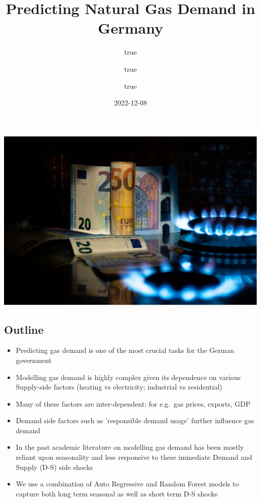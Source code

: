 \documentclass[
]{article}
\title{Predicting Natural Gas Demand in Germany}
\author{true \and true \and true}
\date{2022-12-08}
\providecommand{\tightlist}{%
  \setlength{\itemsep}{0pt}\setlength{\parskip}{0pt}}
\begin{document}
\maketitle

{
\setcounter{tocdepth}{2}
\tableofcontents
}
\includegraphics[width=1\linewidth]{figures/Gas1}

\hypertarget{outline}{%
\subsection{Outline}\label{outline}}

\begin{itemize}
\tightlist
\item
  Predicting gas demand is one of the most crucial tasks for the German
  government
\item
  Modelling gas demand is highly complex given its dependence on various
  Supply-side factors (heating vs electricity; industrial vs
  residential)
\item
  Many of these factors are inter-dependent; for e.g.~gas prices,
  exports, GDP
\item
  Demand side factors such as 'responsible demand usage' further
  influence gas demand
\item
  In the past academic literature on modelling gas demand has been
  mostly reliant upon seasonality and less responsive to these immediate
  Demand and Supply (D-S) side shocks
\item
  We use a combination of Auto Regressive and Random Forest models to
  capture both long term seasonal as well as short term D-S shocks
\end{itemize}
\end{document}
